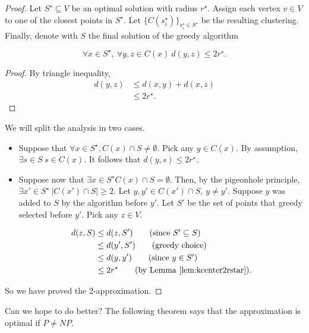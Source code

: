 \begin{proof}
Let $S^\star \subseteq V$ be an optimal solution with radius $r^\star$. Assign each vertex $v \in V$ to one of the closest points in $S^\star$. Let $\{C(s_i^\star)\}_{s_i^\star \in S^\star}$ be the resulting clustering. Finally, denote with $S$ the final solution of the greedy algorithm

\begin{lem}\label{lem:kcenter2rstar}
	\begin{equation}
	\forall x \in S^\star,\ \forall y, z \in C(x)\ d(y, z) \leq 2r^\star.
	\end{equation}
\end{lem}

\begin{proof}
	By triangle inequality,
	\begin{align}
		d(y, z) &\leq d(x, y) + d(x, z)\\
		&\leq 2r^\star.
	\end{align}
\end{proof}

We will split the analysis in two cases.

\begin{itemize}
	\item Suppose that $\forall x \in S^\star, C(x) \cap S \neq \emptyset$. Pick any $y \in C(x)$. By assumption, $\exists s \in S\  s \in C(x)$. It follows that  $d(y, s) \leq 2r^\star$.
	\item Suppose now that $\exists x \in S^\star C(x) \cap S = \emptyset$. Then, by the pigeonhole principle, $\exists x' \in S^\star\ |C(x') \cap S| \geq 2$. Let $y, y' \in C(x') \cap S,\ y \neq y'$. Suppose $y$ was added to $S$ by the algorithm before $y'$. Let $S'$ be the set of points that greedy selected before $y'$. Pick  any $z \in V$.
	
	\begin{align}
		d(z, S) &\leq d(z, S') \tag{since $S' \subseteq S$}\\
		&\leq d(y', S') \tag{greedy choice}\\
		&\leq d(y, y') \tag{since $y \in S'$}\\
		&\leq 2r^\star \tag{by Lemma \ref{lem:kcenter2rstar}}.
	\end{align}
\end{itemize}

So we have proved the 2-approximation.
\end{proof}
 Can we hope to do better? The following theorem says that the approximation is optimal if $P\neq NP$.
